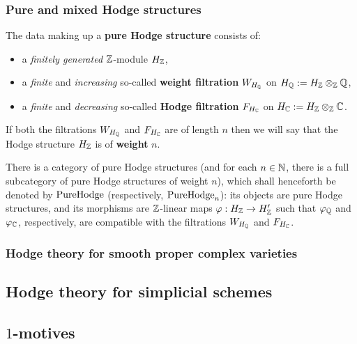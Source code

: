         \subsubsection{Pure and mixed Hodge structures}
            \begin{definition} \label{def: pure_hodge_structures}
                The data making up a \textbf{pure Hodge structure} consists of:
                    \begin{itemize}
                        \item a \textit{finitely generated} $\mathbb{Z}$-module $H_{\mathbb{Z}}$,
                        \item a \textit{finite} and \textit{increasing} so-called \textbf{weight filtration} $W_{H_{\mathbb{Q}}}$ on $H_{\Q} := H_{\Z} \tensor_{\Z} \Q$,
                        \item  a \textit{finite} and \textit{decreasing} so-called \textbf{Hodge filtration} $F_{H_{\mathbb{C}}}$ on $H_{\bbC} := H_{\Z} \tensor_{\Z} \bbC$.
                    \end{itemize}
                If both the filtrations $W_{H_{\mathbb{Q}}}$ and $F_{H_{\mathbb{C}}}$ are of length $n$ then we will say that the Hodge structure $H_{\mathbb{Z}}$ is of \textbf{weight} $n$. 
                
                There is a category of pure Hodge structures (and for each $n \in \mathbb{N}$, there is a full subcategory of pure Hodge structures of weight $n$), which shall henceforth be denoted by $\mathrm{Pure}\mathrm{Hodge}$ (respectively, $\mathrm{Pure}\mathrm{Hodge}_n$): its objects are pure Hodge structures, and its morphisms are $\mathbb{Z}$-linear maps $\varphi: H_{\mathbb{Z}} \to H'_{\mathbb{Z}}$ such that $\varphi_{\mathbb{Q}}$ and $\varphi_{\mathbb{C}}$, respectively, are compatible with the filtrations $W_{H_{\mathbb{Q}}}$ and $F_{H_{\mathbb{C}}}$.
            \end{definition}
        
        \subsubsection{Hodge theory for smooth proper complex varieties}
        
    \subsection{Hodge theory for simplicial schemes}
    
    \subsection{\texorpdfstring{$1$}{}-motives}